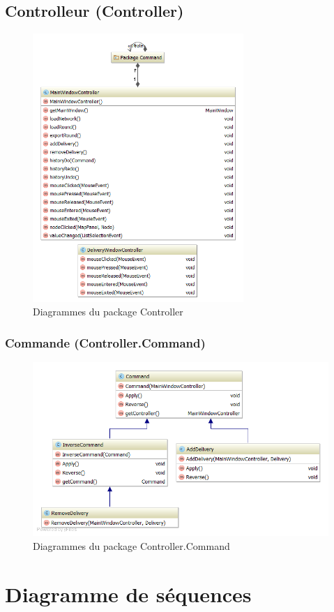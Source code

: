 \subsection{Controlleur (Controller)}

\begin{figure}[h]
    \centering
    \includegraphics[width=80mm]{../diagrams/classes_packages/classes_packages/controller/controller.png}
    \caption{Diagrammes du package Controller}
    \label{diagram:uml_controller}
\end{figure}
\pagebreak

\subsubsection{Commande (Controller.Command)}

\begin{figure}[h]
    \centering
    \includegraphics[width=160mm]{../diagrams/classes_packages/classes_packages/controller/package_command.png}
    \caption{Diagrammes du package Controller.Command}
    \label{diagram:uml_controller_command}
\end{figure}
\pagebreak


\section{Diagramme de s\'equences}
